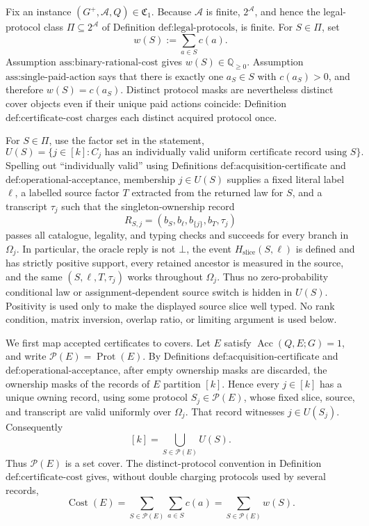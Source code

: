 Fix an instance \((G^{+},\mathcal A,Q)\in\mathfrak C_{1}\).  Because \(\mathcal A\) is finite, \(2^{\mathcal A}\), and hence the legal-protocol class \(\Pi\subseteq 2^{\mathcal A}\) of Definition \(\text{def:legal-protocols}\), is finite.  For \(S\in\Pi\), set
\[
 w(S):=\sum_{a\in S}c(a).
\]
Assumption \(\text{ass:binary-rational-cost}\) gives \(w(S)\in\mathbb Q_{\geq 0}\).  Assumption \(\text{ass:single-paid-action}\) says that there is exactly one \(a_S\in S\) with \(c(a_S)>0\), and therefore \(w(S)=c(a_S)\).  Distinct protocol masks are nevertheless distinct cover objects even if their unique paid actions coincide: Definition \(\text{def:certificate-cost}\) charges each distinct acquired protocol once.

For \(S\in\Pi\), use the factor set in the statement,
\[
 U(S)=\{j\in[k]: C_j\text{ has an individually valid uniform certificate record using }S\}.
\]
Spelling out ``individually valid'' using Definitions \(\text{def:acquisition-certificate}\) and \(\text{def:operational-acceptance}\), membership \(j\in U(S)\) supplies a fixed literal label \(\ell\), a labelled source factor \(T\) extracted from the returned law for \(S\), and a transcript \(\tau_j\) such that the singleton-ownership record
\[
 R_{S,j}=(b_S,b_{\ell},b_{\{j\}},b_T,\tau_j)
\]
passes all catalogue, legality, and typing checks and succeeds for every branch in \(\Omega_j\).  In particular, the oracle reply is not \(\bot\), the event \(H_{\mathrm{slice}}(S,\ell)\) is defined and has strictly positive support, every retained ancestor is measured in the source, and the same \((S,\ell,T,\tau_j)\) works throughout \(\Omega_j\).  Thus no zero-probability conditional law or assignment-dependent source switch is hidden in \(U(S)\).  Positivity is used only to make the displayed source slice well typed.  No rank condition, matrix inversion, overlap ratio, or limiting argument is used below.

We first map accepted certificates to covers.  Let \(E\) satisfy \(\operatorname{Acc}(Q,E;G)=1\), and write \(\mathcal P(E)=\operatorname{Prot}(E)\).  By Definitions \(\text{def:acquisition-certificate}\) and \(\text{def:operational-acceptance}\), after empty ownership masks are discarded, the ownership masks of the records of \(E\) partition \([k]\).  Hence every \(j\in[k]\) has a unique owning record, using some protocol \(S_j\in\mathcal P(E)\), whose fixed slice, source, and transcript are valid uniformly over \(\Omega_j\).  That record witnesses \(j\in U(S_j)\).  Consequently
\[
 [k]=\bigcup_{S\in\mathcal P(E)}U(S).
\tag{1}
\]
Thus \(\mathcal P(E)\) is a set cover.  The distinct-protocol convention in Definition \(\text{def:certificate-cost}\) gives, without double charging protocols used by several records,
\[
 \operatorname{Cost}(E)
 =\sum_{S\in\mathcal P(E)}\sum_{a\in S}c(a)
 =\sum_{S\in\mathcal P(E)}w(S).
\tag{2}
\]

